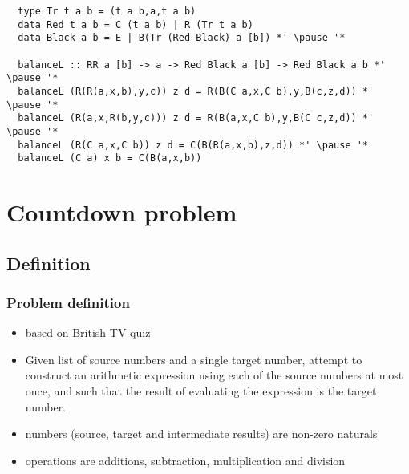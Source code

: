 \documentclass[aspectratio=43]{beamer}
\begin{document}
\begin{frame}[fragile]
 \begin{lstlisting}
  type Tr t a b = (t a b,a,t a b)
  data Red t a b = C (t a b) | R (Tr t a b)
  data Black a b = E | B(Tr (Red Black) a [b]) *' \pause '*
  
  balanceL :: RR a [b] -> a -> Red Black a [b] -> Red Black a b *' \pause '*
  balanceL (R(R(a,x,b),y,c)) z d = R(B(C a,x,C b),y,B(c,z,d)) *' \pause '*
  balanceL (R(a,x,R(b,y,c))) z d = R(B(a,x,C b),y,B(C c,z,d)) *' \pause '*
  balanceL (R(C a,x,C b)) z d = C(B(R(a,x,b),z,d)) *' \pause '*
  balanceL (C a) x b = C(B(a,x,b))
 \end{lstlisting}
\end{frame}

%   








    
    
    







\section{Countdown problem}

\subsection{Definition}

\begin{frame}
 \frametitle{Problem definition}
 \begin{itemize}
  \item based on British TV quiz
  \item Given list of source numbers and a single target number, attempt to construct an arithmetic expression using each of the source numbers at most once, and such that the result of evaluating the expression is the target number.
  \item numbers (source, target and intermediate results) are non-zero naturals
  \item operations are additions, subtraction, multiplication and division
 \end{itemize}
\end{frame}
\end{document}
